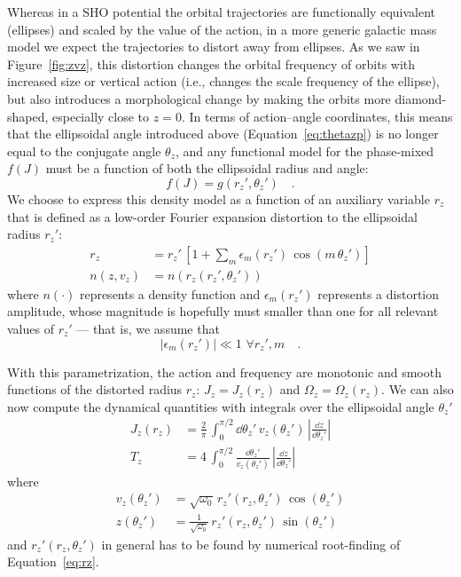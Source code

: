 Whereas in a SHO potential the orbital trajectories are functionally equivalent
(ellipses) and scaled by the value of the action, in a more generic galactic mass model
we expect the trajectories to distort away from ellipses.
As we saw in Figure~\ref{fig:zvz}, this distortion changes the orbital frequency of
orbits with increased size or vertical action (i.e., changes the scale frequency of the
ellipse), but also introduces a morphological change by making the orbits more
diamond-shaped, especially close to $z=0$.
In terms of action--angle coordinates, this means that the ellipsoidal angle introduced
above (Equation~\ref{eq:thetazp}) is no longer equal to the conjugate angle $\theta_z$,
and any functional model for the phase-mixed \df\ $f(J)$ must be a function of both the
ellipsoidal radius and angle:
\begin{equation}
    f(J) = g(r_z', \theta_z') \quad .
\end{equation}
We choose to express this density model as a function of an auxiliary variable $r_z$
that is defined as a low-order Fourier expansion distortion to the ellipsoidal radius
$r_z'$:
\begin{align}
    r_z &= r_z' \, \left[1 + \sum_m \epsilon_m(r_z') \, \cos{\left(m\,\theta_z'\right)}\right] \label{eq:rz} \\
    n(z, v_z) &= n(r_z(r_z', \theta_z'))
\end{align}
where $n(\cdot)$ represents a density function and $\epsilon_m(r_z')$ represents a
distortion amplitude, whose magnitude is hopefully must smaller than one for all
relevant values of $r_z'$ --- that is, we assume that
\begin{equation}
    |\epsilon_m(r_z')| \ll 1 \,\, \forall r_z', m \quad .
\end{equation}

With this parametrization, the action and frequency are monotonic and smooth functions
of the distorted radius $r_z$: $J_z = J_z(r_z)$ and $\Omega_z = \Omega_z(r_z)$.
We can also now compute the dynamical quantities with integrals over the ellipsoidal
angle $\theta_z'$
\begin{align}
    J_z(r_z) &= \frac{2}{\pi} \, \int_0^{\pi/2} \dd \theta_z' \, v_z(\theta_z')
        \, \left|\frac{\dd z}{\dd \theta_z'}\right| \\
    T_z &= 4 \, \int_0^{\pi/2} \frac{\dd \theta_z'}{v_z(\theta_z')}
        \, \left|\frac{\dd z}{\dd \theta_z'}\right|
\end{align}
where
\begin{align}
    v_z(\theta_z') &= \sqrt{\omega_0} \, r_z'(r_z, \theta_z') \, \cos{(\theta_z')} \\
    z(\theta_z') &= \frac{1}{\sqrt{\omega_0}} \, r_z'(r_z, \theta_z') \, \sin{(\theta_z')}
\end{align}
and $r_z'(r_z, \theta_z')$ in general has to be found by numerical root-finding of
Equation~\ref{eq:rz}.


